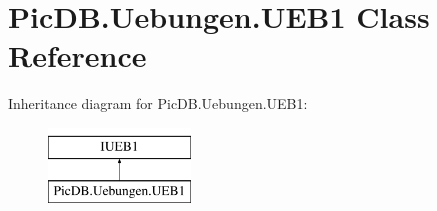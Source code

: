 \hypertarget{class_pic_d_b_1_1_uebungen_1_1_u_e_b1}{}\section{Pic\+D\+B.\+Uebungen.\+U\+E\+B1 Class Reference}
\label{class_pic_d_b_1_1_uebungen_1_1_u_e_b1}
Inheritance diagram for Pic\+D\+B.\+Uebungen.\+U\+E\+B1\+:\begin{figure}[H]
\begin{center}
\leavevmode
\includegraphics[height=2.000000cm]{class_pic_d_b_1_1_uebungen_1_1_u_e_b1}
\end{center}
\end{figure}
